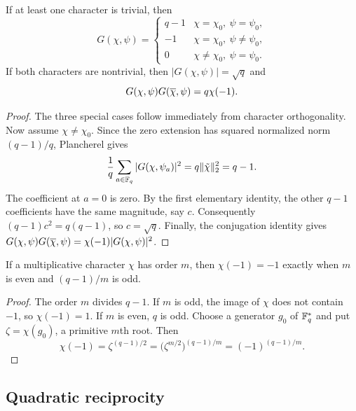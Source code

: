 \begin{prop}
\label{prop-calcul-sums-gauss}
If at least one character is trivial, then
\[
 G(\chi,\psi)=\begin{cases}
 q-1&\chi=\chi_0,\ \psi=\psi_0,\\
 -1&\chi=\chi_0,\ \psi\neq\psi_0,\\
 0&\chi\neq\chi_0,\ \psi=\psi_0.
 \end{cases}
\]
If both characters are nontrivial, then $|G(\chi,\psi)|=\sqrt q$ and
\begin{equation}
\label{eq-prop-ptes-sums-gauss-iv}
 G(\chi,\psi)G(\overline{\chi},\psi)=q\chi(-1).
\end{equation}
\end{prop}
\begin{proof}
The three special cases follow immediately from character orthogonality.
Now assume $\chi\neq\chi_0$. Since the zero extension has squared normalized
norm $(q-1)/q$, Plancherel gives
\begin{equation}
\label{eq-prop-calculus-sum-gauss-1}
 \frac1q\sum_{a\in\mathbb{F}_q}|G(\chi,\psi_a)|^2
 =q\lVert\tilde{\chi}\rVert_2^2=q-1.
\end{equation}
The coefficient at $a=0$ is zero. By the first elementary identity, the
other $q-1$ coefficients have the same magnitude, say $c$.
Consequently $(q-1)c^2=q(q-1)$, so $c=\sqrt q$.
Finally, the conjugation identity gives
$G(\chi,\psi)G(\overline{\chi},\psi)=\chi(-1)|G(\chi,\psi)|^2$.
\end{proof}


\begin{prop}
\label{prop-calcul-psi-1}
If a multiplicative character $\chi$ has order $m$, then $\chi(-1)=-1$
exactly when $m$ is even and $(q-1)/m$ is odd.
\end{prop}
\begin{proof}
The order $m$ divides $q-1$. If $m$ is odd, the image of $\chi$ does not
contain $-1$, so $\chi(-1)=1$. If $m$ is even, $q$ is odd. Choose a generator
$g_0$ of $\mathbb{F}_q^*$ and put $\zeta=\chi(g_0)$, a primitive $m$th root.
Then
\[
 \chi(-1)=\zeta^{(q-1)/2}
 =\big(\zeta^{m/2}\big)^{(q-1)/m}=(-1)^{(q-1)/m}.
\]
\end{proof}

\subsection{Quadratic reciprocity}

